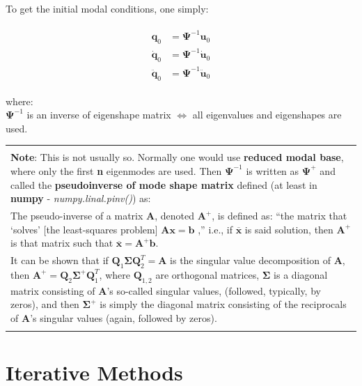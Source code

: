 \documentclass[10pt,b5paper,titlepage]{book}
\newenvironment{bbox}[1][1.0]
{
    \begin{center}
        \begin{tabular}{|p{#1\textwidth}|}
            \hline\\
}
{
            \\\\\hline
        \end{tabular}
    \end{center}
}
\newenvironment{ematrix}
{
    \begin{eqnarray}
        \begin{aligned}
}
{
        \end{aligned}
    \end{eqnarray}
}
\begin{document}
To get the initial modal conditions, one simply:

\begin{ematrix}
    \mathbf{q}_0 &= \mathbf{\Psi}^{-1} \mathbf{u}_0 \\
    \mathbf{\dot{q}}_0 &= \mathbf{\Psi}^{-1} \mathbf{\dot{u}}_0 \\
    \mathbf{\ddot{q}}_0 &= \mathbf{\Psi}^{-1} \mathbf{\ddot{u}}_0
\end{ematrix}

where:\\
$ \mathbf{\Psi}^{-1} $ is an inverse of eigenshape matrix $ \Leftrightarrow $ all eigenvalues
and eigenshapes are used.

\begin{bbox}[0.96]
    \textbf{Note}: This is not usually so. Normally one would use
    \textbf{reduced modal base}, where only the first \textbf{n} eigenmodes are used. Then
    $ \mathbf{\Psi}^{-1} $ is written as $ \mathbf{\Psi}^{+} $ and called the
    \textbf{pseudoinverse of mode shape matrix} defined (at least in \textbf{numpy}
    - \textit{numpy.linal.pinv()}) as:\\

    \smallskip
    The pseudo-inverse of a matrix $ \mathbf{A} $, denoted $ \mathbf{A}^{+} $,
    is defined as: “the matrix that ‘solves’ [the least-squares problem]
    $ \mathbf{A} \mathbf{x} = \mathbf{b} $ ,” i.e., if $ \overline{\mathbf{x}} $
    is said solution, then $ \mathbf{A}^{+} $ is that matrix such that
    $ \overline{\mathbf{x}} = \mathbf{A}^{+} \mathbf{b} $.\\

    \smallskip
    It can be shown that if $ \mathbf{Q}_1 \mathbf{\Sigma} \mathbf{Q}_2^T = \mathbf{A} $
    is the singular value decomposition of $ \mathbf{A} $, then
    $ \mathbf{A}^{+} = \mathbf{Q}_2 \mathbf{\Sigma}^{+} \mathbf{Q}_1^T $, where $ \mathbf{Q}_{1,2} $
    are orthogonal matrices, $ \mathbf{\Sigma} $  is a diagonal matrix consisting of
    $ \mathbf{A} $’s so-called singular values, (followed, typically, by zeros),
    and then $ \mathbf{\Sigma}^{+} $ is simply the diagonal matrix consisting
    of the reciprocals of $ \mathbf{A} $’s singular values (again, followed
    by zeros).
\end{bbox}




\chapter{Iterative Methods}
\end{document}

